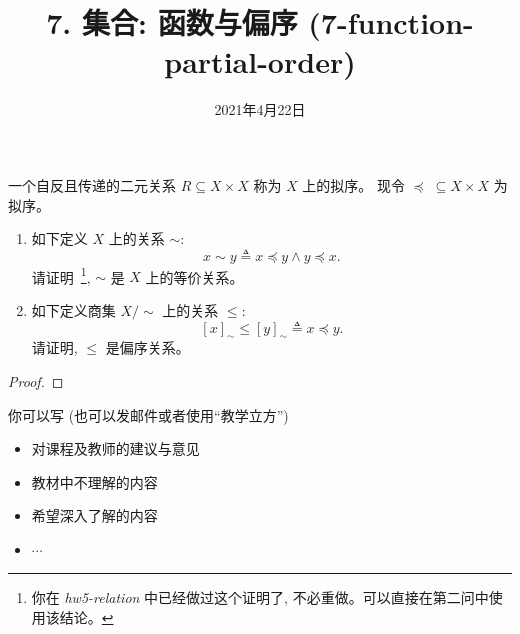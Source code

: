 \documentclass[a4paper, justified]{tufte-handout}
\title{7. 集合: 函数与偏序 (7-function-partial-order)}
\date{2021年4月22日}
\begin{document}
\maketitle
\noplagiarism %
\begin{abstract}
\end{abstract}
\beginrequired

\begin{problem}[\score{4 = 0 + 4} $\star\star\star$]
  一个自反且传递的二元关系 $R \subseteq X \times X$
  称为 $X$ 上的拟序。
  现令 $\preceq\; \subseteq X \times X$ 为拟序。

  \begin{enumerate}[(1)]
    \item 如下定义 $X$ 上的关系 $\sim$:
      \[
        x \sim y \triangleq x \preceq y \land y \preceq x.
      \]
      请证明~\footnote{你在 \textsl{hw5-relation} 中已经做过这个证明了,
      不必重做。可以直接在第二问中使用该结论。}, $\sim$ 是 $X$ 上的等价关系。
    \item 如下定义商集 $X/\sim$ 上的关系 $\le$:
      \[
        [x]_{\sim} \le [y]_{\sim} \triangleq x \preceq y.
      \]
      请证明, $\le$ 是偏序关系。
  \end{enumerate}
\end{problem}

\begin{proof}
\end{proof}

\begincorrection

\beginfb

你可以写 (也可以发邮件或者使用``教学立方'')
\begin{itemize}
  \item 对课程及教师的建议与意见
  \item 教材中不理解的内容
  \item 希望深入了解的内容
  \item $\cdots$
\end{itemize}
\end{document}
